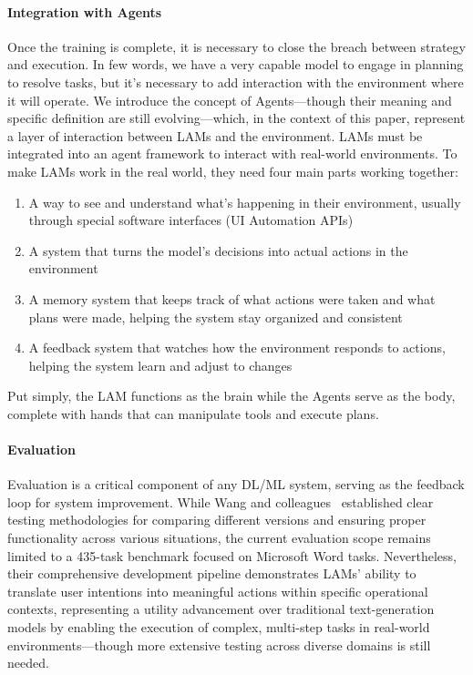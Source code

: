 \documentclass[journal,twoside,10pt]{IEEEtran}
\begin{document}
\paragraph{Integration with Agents}
Once the training is complete, it is necessary to close the breach between strategy and execution. In few words, we have a very capable model to engage in planning to resolve tasks, but it's necessary to add interaction with the environment where it will operate. We introduce the concept of Agents—though their meaning and specific definition are still evolving—which, in the context of this paper, represent a layer of interaction between LAMs and the environment. LAMs must be integrated into an agent framework to interact with real-world environments. To make LAMs work in the real world, they need four main parts working together:

\begin{enumerate}
    \item A way to see and understand what's happening in their environment, usually through special software interfaces (UI Automation APIs)
    \item A system that turns the model's decisions into actual actions in the environment
    \item A memory system that keeps track of what actions were taken and what plans were made, helping the system stay organized and consistent
    \item A feedback system that watches how the environment responds to actions, helping the system learn and adjust to changes
\end{enumerate}

Put simply, the LAM functions as the brain while the Agents serve as the body, complete with hands that can manipulate tools and execute plans.

\paragraph{Evaluation}
Evaluation is a critical component of any DL/ML system, serving as the feedback loop for system improvement. While Wang and colleagues~\cite{wang2025lam} established clear testing methodologies for comparing different versions and ensuring proper functionality across various situations, the current evaluation scope remains limited to a 435-task benchmark focused on Microsoft Word tasks. Nevertheless, their comprehensive development pipeline demonstrates LAMs' ability to translate user intentions into meaningful actions within specific operational contexts, representing a utility advancement over traditional text-generation models by enabling the execution of complex, multi-step tasks in real-world environments—though more extensive testing across diverse domains is still needed.
\end{document}
